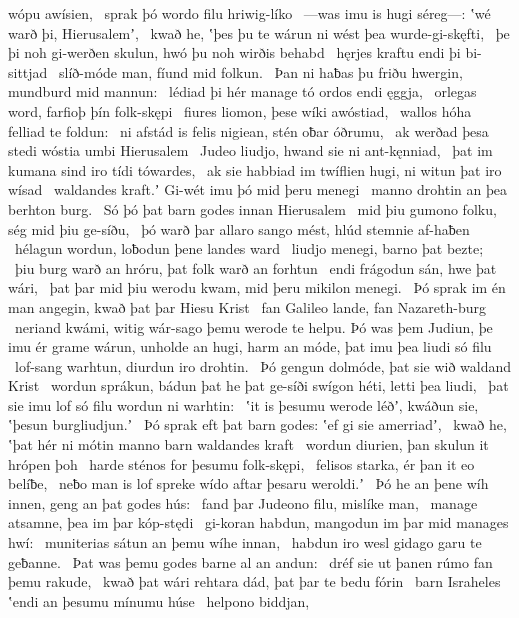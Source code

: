 wópu awísien, \hld\ sprak þó wordo filu
hriwig-líko \hld\ —was imu is hugi séreg—:
ʽwé warð þi, Hierusalemʼ, \hld\ kwað he, ʽþes þu te wárun ni wést
þea wurde-gi-skęfti, \hld\ þe þi noh gi-werðen skulun,
hwó þu noh wirðis behabd \hld\ hęrjes kraftu
endi þi bi-sittjad \hld\ slíð-móde man,
fíund mid folkun. \hld\ Þan ni haƀas þu friðu hwergin,
mundburd mid mannun: \hld\ lédiad þi hér manage tó
ordos endi ęggja, \hld\ orlegas word,
farfioþ þín folk-skępi \hld\ fiures liomon,
þese wíki awóstiad, \hld\ wallos hóha
felliad te foldun: \hld\ ni afstád is felis nigiean,
stén oƀar óðrumu, \hld\ ak werðad þesa stedi wóstia
umbi Hierusalem \hld\ Judeo liudjo,
hwand sie ni ant-kęnniad, \hld\ þat im kumana sind
iro tídi tówardes, \hld\ ak sie habbiad im twíflien hugi,
ni witun þat iro wísad \hld\ waldandes kraft.ʼ
Gi-wét imu þó mid þeru menegi \hld\ manno drohtin
an þea berhton burg. \hld\ Só þó þat barn godes
innan Hierusalem \hld\ mid þiu gumono folku,
ség mid þiu ge-síðu, \hld\ þó warð þar allaro sango mést,
hlúd stemnie af-haƀen \hld\ hélagun wordun,
loƀodun þene landes ward \hld\ liudjo menegi,
barno þat bezte; \hld\ þiu burg warð an hróru,
þat folk warð an forhtun \hld\ endi frágodun sán,
hwe þat wári, \hld\ þat þar mid þiu werodu kwam,
mid þeru mikilon menegi. \hld\ Þó sprak im én man angegin,
kwað þat þar Hiesu Krist \hld\ fan Galileo lande,
fan Nazareth-burg \hld\ neriand kwámi,
witig wár-sago þemu werode te helpu.
Þó was þem Judiun, þe imu ér grame wárun,
unholde an hugi, harm an móde,
þat imu þea liudi só filu \hld\ lof-sang warhtun,
diurdun iro drohtin. \hld\ Þó gengun dolmóde,
þat sie wið waldand Krist \hld\ wordun sprákun,
bádun þat he þat ge-síði swígon héti,
letti þea liudi, \hld\ þat sie imu lof só filu
wordun ni warhtin: \hld\ ʽit is þesumu werode léðʼ, kwáðun sie,
ʽþesun burgliudjun.ʼ \hld\ Þó sprak eft þat barn godes:
ʽef gi sie amerriadʼ, \hld\ kwað he, ʽþat hér ni mótin manno barn
waldandes kraft \hld\ wordun diurien,
þan skulun it hrópen þoh \hld\ harde sténos
for þesumu folk-skępi, \hld\ felisos starka,
ér þan it eo belíƀe, \hld\ neƀo man is lof spreke
wído aftar þesaru weroldi.ʼ \hld\ Þó he an þene wíh innen,
geng an þat godes hús: \hld\ fand þar Judeono filu,
mislíke man, \hld\ manage atsamne,
þea im þar kóp-stędi \hld\ gi-koran habdun,
mangodun im þar mid manages hwí: \hld\ muniterias sátun
an þemu wíhe innan, \hld\ habdun iro wesl gidago
garu te geƀanne. \hld\ Þat was þemu godes barne
al an andun: \hld\ dréf sie ut þanen
rúmo fan þemu rakude, \hld\ kwað þat wári rehtara dád,
þat þar te bedu fórin \hld\ barn Israheles
ʽendi an þesumu mínumu húse \hld\ helpono biddjan,
